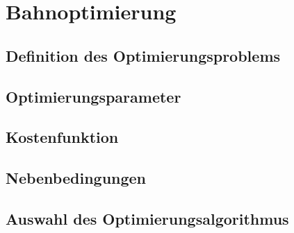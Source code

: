 \chapter{Bahnoptimierung}
\section{Definition des Optimierungsproblems} 
\section{Optimierungsparameter}
\section{Kostenfunktion}
\section{Nebenbedingungen}
\section{Auswahl des Optimierungsalgorithmus}